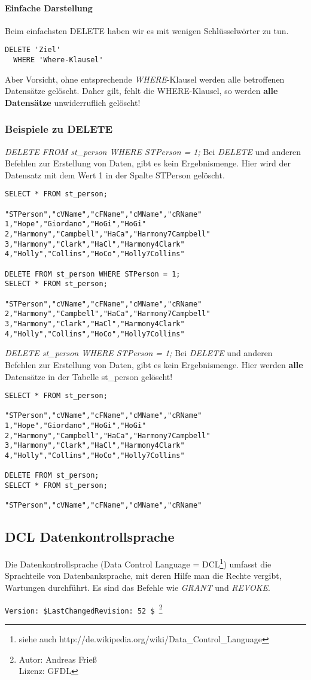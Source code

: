 \paragraph{Einfache Darstellung}
Beim einfachsten DELETE haben wir es mit wenigen Schlüsselwörter zu tun.
\begin{verbatim}
DELETE 'Ziel'
  WHERE 'Where-Klausel'
\end{verbatim}
Aber Vorsicht, ohne entsprechende \emph{WHERE}-Klausel werden alle betroffenen Datensätze gelöscht. Daher gilt, fehlt die WHERE-Klausel, so werden \textbf{alle Datensätze} unwiderruflich gelöscht!


\subsubsection{Beispiele zu DELETE}
\emph{DELETE FROM st\_person WHERE STPerson = 1;}
Bei \emph{DELETE} und anderen Befehlen zur Erstellung von Daten, gibt es kein Ergebnismenge.
Hier wird der Datensatz mit dem Wert 1 in der Spalte STPerson gelöscht.
\begin{verbatim}
SELECT * FROM st_person;

"STPerson","cVName","cFName","cMName","cRName"
1,"Hope","Giordano","HoGi","HoGi"
2,"Harmony","Campbell","HaCa","Harmony7Campbell"
3,"Harmony","Clark","HaCl","Harmony4Clark"
4,"Holly","Collins","HoCo","Holly7Collins"

DELETE FROM st_person WHERE STPerson = 1;
SELECT * FROM st_person;

"STPerson","cVName","cFName","cMName","cRName"
2,"Harmony","Campbell","HaCa","Harmony7Campbell"
3,"Harmony","Clark","HaCl","Harmony4Clark"
4,"Holly","Collins","HoCo","Holly7Collins"
\end{verbatim}

\emph{DELETE st\_person WHERE STPerson = 1;}
Bei \emph{DELETE} und anderen Befehlen zur Erstellung von Daten, gibt es kein Ergebnismenge.
Hier werden \textbf{alle} Datensätze in der Tabelle st\_person gelöscht!
\begin{verbatim}
SELECT * FROM st_person;

"STPerson","cVName","cFName","cMName","cRName"
1,"Hope","Giordano","HoGi","HoGi"
2,"Harmony","Campbell","HaCa","Harmony7Campbell"
3,"Harmony","Clark","HaCl","Harmony4Clark"
4,"Holly","Collins","HoCo","Holly7Collins"

DELETE FROM st_person;
SELECT * FROM st_person;

"STPerson","cVName","cFName","cMName","cRName"
\end{verbatim}


\subsection{DCL Datenkontrollsprache}\label{DCL}
Die Datenkontrollsprache (Data Control Language = DCL\footnote{siehe auch http://de.wikipedia.org/wiki/Data\_Control\_Language}) umfasst die Sprachteile von Datenbanksprache, mit deren Hilfe man die Rechte vergibt, Wartungen durchführt. Es sind das Befehle wie \emph{GRANT} und \emph{REVOKE}. 

\verb|Version: $LastChangedRevision: 52 $ |\footnote{ Autor: Andreas Frieß\\Lizenz: GFDL}